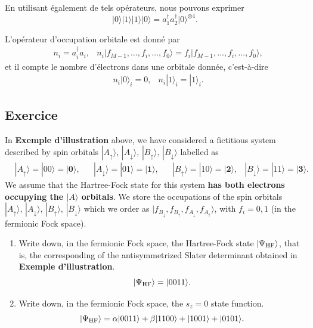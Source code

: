En utilisant également de tels opérateurs, nous pouvons exprimer
\begin{equation}
|0\rangle |1\rangle |1\rangle |0\rangle = a^\dagger_1a^\dagger_2 |0\rangle^{\otimes 4}.
\end{equation}

L'opérateur d'occupation orbitale est donné par 
\begin{align}
&n_i = a^\dagger_i a_i, &n_i |f_{M-1},\dots,f_i,\dots, f_0\rangle= f_i |f_{M-1},\dots,f_i,\dots, f_0\rangle,
\end{align} 
et il compte le nombre d'électrons dans une orbitale donnée, c'est-à-dire 
\begin{align} 
&n_i |0\rangle_i = 0, &n_i |1\rangle_i = |1\rangle_i. 
\end{align}

\hypertarget{exercice}{%
\subsection{Exercice}\label{exercice}}

In \textbf{Exemple d'illustration} above, we have considered a
fictitious system described by spin orbitals
$|A_\uparrow\rangle,\,|A_\downarrow\rangle,\,|B_\uparrow\rangle,\,|B_\downarrow\rangle$
labelled as 
\begin{align}
 &|A_\uparrow\rangle=|00\rangle=|\mathbf{0}\rangle,  &&|A_\downarrow\rangle=|01\rangle=|\mathbf{1}\rangle,
&&|B_\uparrow\rangle=|10\rangle=|\mathbf{2}\rangle,  &|B_\downarrow\rangle=|11\rangle=|\mathbf{3}\rangle.
\end{align} 
We assume that the Hartree-Fock state for this system
\textbf{has both electrons occupying the $|A\rangle$ orbitals}. We store the occupations of the spin orbitals
$|A_\uparrow\rangle,\,|A_\downarrow\rangle,\,|B_\uparrow\rangle,\,|B_\downarrow\rangle$
which we order as 
$|f_{B_\downarrow},f_{B_\uparrow},f_{A_\downarrow},f_{A_\uparrow}\rangle$,
with $f_i=0,1$ (in the fermionic Fock space).

\begin{enumerate}
\item Write down, in the fermionic Fock space, the Hartree-Fock state
  $|\Psi_{\rm HF}\rangle$, that is, the corresponding of the
  antisymmetrized Slater determinant obtained in \textbf{Exemple
  d'illustration}. 
  \begin{equation}
  |\Psi_{\rm HF}\rangle = |0011\rangle .
  \end{equation}
\item Write down, in the fermionic Fock space, the $s_z = 0$ state
  function. 
  \begin{equation}
  |\Psi_{\rm HF}\rangle = \alpha|0011\rangle + \beta|1100\rangle + |1001\rangle + |0101\rangle .
  \end{equation}
\end{enumerate}

